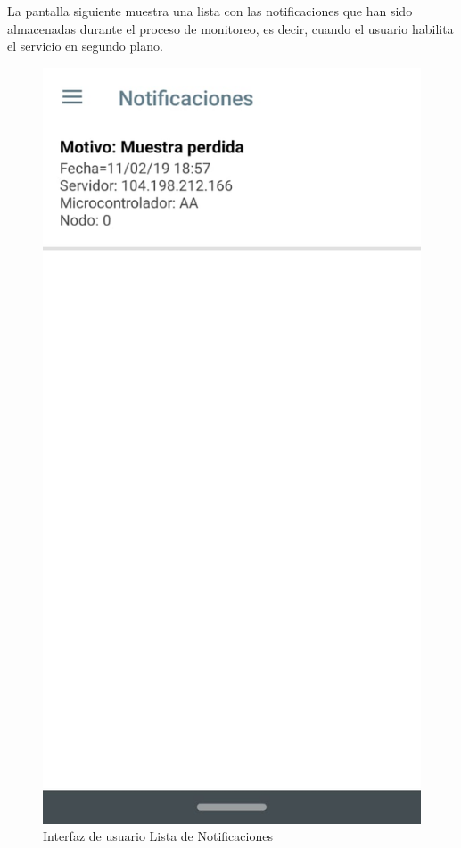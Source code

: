 La pantalla siguiente muestra una lista con las notificaciones que han sido almacenadas durante el proceso de monitoreo, es decir, cuando el usuario habilita el servicio en segundo plano.

\begin{figure}[H]
	\centering
	\includegraphics[scale=0.4]{Capitulo4/software/submodulos/images/man22.png}
	\caption{Interfaz de usuario Lista de Notificaciones}
	\label{fig:Lista de Notificaciones}
\end{figure}


